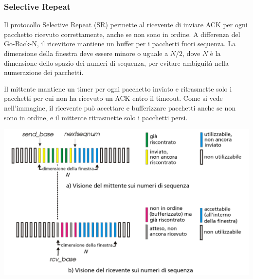\subsubsection{Selective Repeat}
Il protocollo Selective Repeat (SR) permette al ricevente di inviare ACK per ogni pacchetto ricevuto correttamente, anche se non sono in ordine. A differenza del Go-Back-N, il ricevitore mantiene un buffer per i pacchetti fuori sequenza. La dimensione della finestra deve essere minore o uguale a $N/2$, dove $N$ è la dimensione dello spazio dei numeri di sequenza, per evitare ambiguità nella numerazione dei pacchetti.

Il mittente mantiene un timer per ogni pacchetto inviato e ritrasmette solo i pacchetti per cui non ha ricevuto un ACK entro il timeout. Come si vede nell'immagine, il ricevente può accettare e bufferizzare pacchetti anche se non sono in ordine, e il mittente ritrasmette solo i pacchetti persi.

\begin{center}
\includegraphics[width=\textwidth]{./img/ripetizioneselettiva.png}
\end{center}


